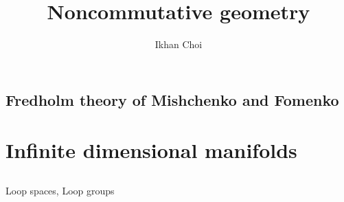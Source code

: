 \documentclass{../../large}
\begin{document}
\title{Noncommutative geometry}
\author{Ikhan Choi}
\maketitle
\tableofcontents


\chapter{}


\section{Fredholm theory of Mishchenko and Fomenko}




\chapter{Infinite dimensional manifolds}
\section{}

Loop spaces,
Loop groups
\end{document}

